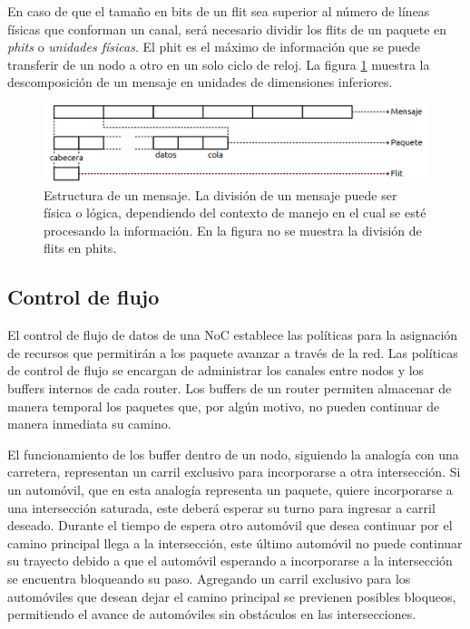 En caso de que el tamaño en bits de un flit sea superior al número de líneas físicas que conforman un canal, será necesario dividir los flits de un paquete en \textit{phits} o \textit{unidades físicas}. El phit es el máximo de información que se puede transferir de un nodo a otro en un solo ciclo de reloj. La figura \ref{fig:ch1_jerarquia_mensajes} muestra la descomposición de un mensaje en unidades de dimensiones inferiores.

\begin{figure}
	\begin{center}
		\includegraphics[scale=0.7]{figures/ch1_jerarquia_mensajes.png}
	\end{center}
	\caption
		{	
			Estructura de un mensaje. La división de un mensaje puede ser física o lógica, dependiendo del contexto de manejo en el cual se esté procesando la información. En la figura no se muestra la división de flits en phits.  
		}
	\label{fig:ch1_jerarquia_mensajes}
\end{figure}


\subsection{Control de flujo}

El control de flujo de datos de una NoC establece las políticas para la asignación de recursos que permitirán a los paquete avanzar a través de la red. Las políticas de control de flujo se encargan de administrar los canales entre nodos y los buffers internos de cada router. Los buffers de un router permiten almacenar de manera temporal los paquetes que, por algún motivo, no pueden continuar de manera inmediata su camino. 

El funcionamiento de los buffer dentro de un nodo, siguiendo la analogía con una carretera, representan un carril exclusivo para incorporarse a otra intersección. Si un automóvil, que en esta analogía representa un paquete, quiere incorporarse a una intersección saturada, este deberá esperar su turno para ingresar a carril deseado. Durante el tiempo de espera otro automóvil que desea continuar por el camino principal llega a la intersección, este último automóvil no puede continuar su trayecto debido a que el automóvil esperando a incorporarse a la intersección se encuentra bloqueando su paso. Agregando un carril exclusivo para los automóviles que desean dejar el camino principal se previenen posibles bloqueos, permitiendo el avance de automóviles sin obstáculos en las intersecciones.


